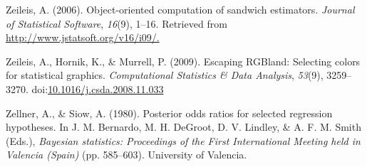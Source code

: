 \documentclass[english,man]{apa6}
\theoremstyle{definition}
\theoremstyle{definition}
\theoremstyle{remark}
\begin{document}
\hypertarget{ref-R-sandwich_b}{}
Zeileis, A. (2006). Object-oriented computation of sandwich estimators.
\emph{Journal of Statistical Software}, \emph{16}(9), 1--16. Retrieved
from \url{http://www.jstatsoft.org/v16/i09/.}

\hypertarget{ref-R-colorspace_a}{}
Zeileis, A., Hornik, K., \& Murrell, P. (2009). Escaping RGBland:
Selecting colors for statistical graphics. \emph{Computational
Statistics \& Data Analysis}, \emph{53}(9), 3259--3270.
doi:\href{https://doi.org/10.1016/j.csda.2008.11.033}{10.1016/j.csda.2008.11.033}

\hypertarget{ref-Zellner:Siow:1980}{}
Zellner, A., \& Siow, A. (1980). Posterior odds ratios for selected
regression hypotheses. In J. M. Bernardo, M. H. DeGroot, D. V. Lindley,
\& A. F. M. Smith (Eds.), \emph{Bayesian statistics: Proceedings of the
First International Meeting held in Valencia (Spain)} (pp. 585--603).
University of Valencia.
\end{document}
